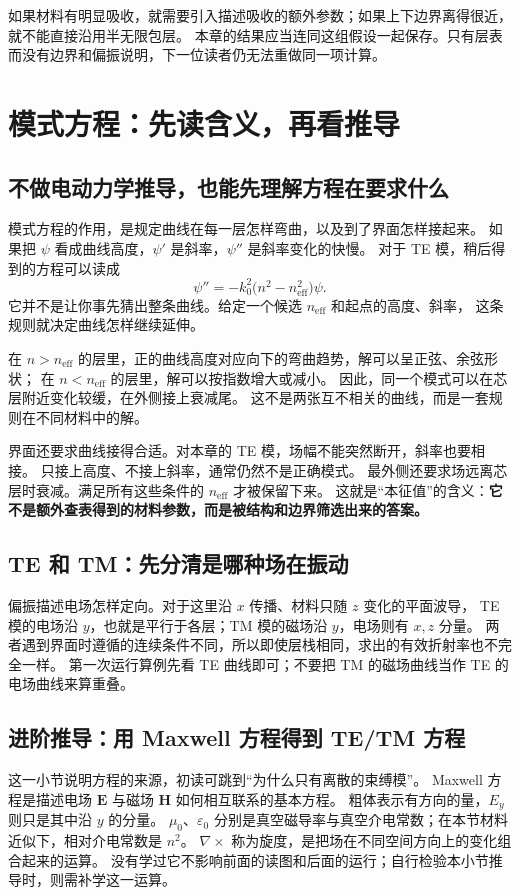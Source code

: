 如果材料有明显吸收，就需要引入描述吸收的额外参数；如果上下边界离得很近，就不能直接沿用半无限包层。
本章的结果应当连同这组假设一起保存。只有层表而没有边界和偏振说明，下一位读者仍无法重做同一项计算。

\section{模式方程：先读含义，再看推导}
\label{sec:vertical-mode-equations}
\subsection{不做电动力学推导，也能先理解方程在要求什么}
模式方程的作用，是规定曲线在每一层怎样弯曲，以及到了界面怎样接起来。
如果把 $\psi$ 看成曲线高度，$\psi'$ 是斜率，$\psi''$ 是斜率变化的快慢。
对于 TE 模，稍后得到的方程可以读成
\[
\psi''=-k_0^2\bigl(n^2-n_{\mathrm{eff}}^2\bigr)\psi.
\]
它并不是让你事先猜出整条曲线。给定一个候选 $n_{\mathrm{eff}}$ 和起点的高度、斜率，
这条规则就决定曲线怎样继续延伸。

在 $n>n_{\mathrm{eff}}$ 的层里，正的曲线高度对应向下的弯曲趋势，解可以呈正弦、余弦形状；
在 $n<n_{\mathrm{eff}}$ 的层里，解可以按指数增大或减小。
因此，同一个模式可以在芯层附近变化较缓，在外侧接上衰减尾。
这不是两张互不相关的曲线，而是一套规则在不同材料中的解。

界面还要求曲线接得合适。对本章的 TE 模，场幅不能突然断开，斜率也要相接。
只接上高度、不接上斜率，通常仍然不是正确模式。
最外侧还要求场远离芯层时衰减。满足所有这些条件的 $n_{\mathrm{eff}}$ 才被保留下来。
这就是“本征值”的含义：\textbf{它不是额外查表得到的材料参数，而是被结构和边界筛选出来的答案。}

\subsection{TE 和 TM：先分清是哪种场在振动}
偏振描述电场怎样定向。对于这里沿 $x$ 传播、材料只随 $z$ 变化的平面波导，
TE 模的电场沿 $y$，也就是平行于各层；TM 模的磁场沿 $y$，电场则有 $x,z$ 分量。
两者遇到界面时遵循的连续条件不同，所以即使层栈相同，求出的有效折射率也不完全一样。
第一次运行算例先看 TE 曲线即可；不要把 TM 的磁场曲线当作 TE 的电场曲线来算重叠。

\subsection{进阶推导：用 Maxwell 方程得到 TE/TM 方程}
这一小节说明方程的来源，初读可跳到“为什么只有离散的束缚模”。
Maxwell 方程是描述电场 $\mathbf E$ 与磁场 $\mathbf H$ 如何相互联系的基本方程。
粗体表示有方向的量，$E_y$ 则只是其中沿 $y$ 的分量。
$\mu_0$、$\varepsilon_0$ 分别是真空磁导率与真空介电常数；在本节材料近似下，相对介电常数是 $n^2$。
$\nabla\times$ 称为旋度，是把场在不同空间方向上的变化组合起来的运算。
没有学过它不影响前面的读图和后面的运行；自行检验本小节推导时，则需补学这一运算。

